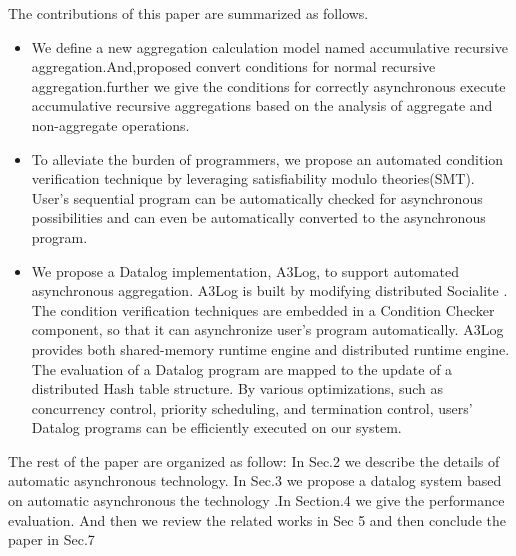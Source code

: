The contributions of this paper are summarized as follows.
\begin{itemize}
	\item We define a new aggregation calculation model named accumulative recursive aggregation.And,proposed convert conditions for normal recursive aggregation.further we give the conditions for correctly asynchronous execute accumulative recursive aggregations based on the analysis of aggregate and non-aggregate operations.  
	\item To alleviate the burden of programmers, we propose an automated condition verification technique by leveraging satisfiability modulo theories(SMT). User's sequential program can be automatically checked for asynchronous possibilities and can even be automatically converted to the asynchronous program.
	\item We propose a Datalog implementation, A3Log, to support automated asynchronous aggregation. A3Log is built by modifying distributed Socialite \cite{Seo:2013:DSD:2556549.2556572}. The condition verification techniques are embedded in a Condition Checker component, so that it can asynchronize user's program automatically.	 A3Log provides both shared-memory runtime engine and distributed runtime engine. The evaluation of a Datalog program are mapped to the update of a distributed Hash table structure. By various optimizations, such as concurrency control, priority scheduling, and termination control, users' Datalog programs can be efficiently executed on our system.
\end{itemize}

The rest of the paper are organized as follow: In Sec.2 we describe the details of  automatic asynchronous technology. In Sec.3 we propose a datalog system based on automatic asynchronous the technology .In Section.4  we give the performance evaluation. And then we review the related works in Sec 5 and then conclude the paper in Sec.7
